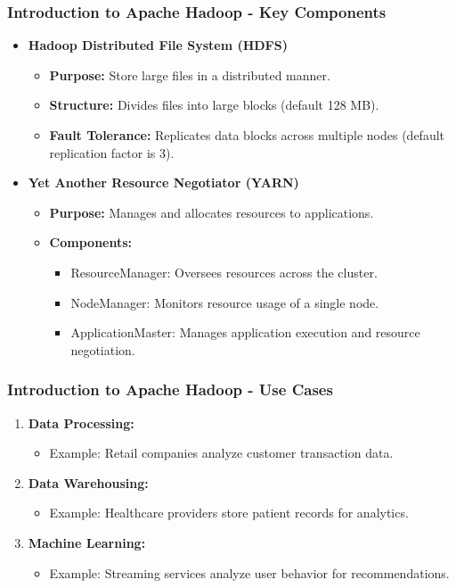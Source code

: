 \documentclass[aspectratio=169]{beamer}
\begin{document}
\begin{frame}[fragile]
    \frametitle{Introduction to Apache Hadoop - Key Components}
    \begin{itemize}
        \item \textbf{Hadoop Distributed File System (HDFS)}
        \begin{itemize}
            \item \textbf{Purpose:} Store large files in a distributed manner.
            \item \textbf{Structure:} Divides files into large blocks (default 128 MB).
            \item \textbf{Fault Tolerance:} Replicates data blocks across multiple nodes (default replication factor is 3).
        \end{itemize}

        \item \textbf{Yet Another Resource Negotiator (YARN)}
        \begin{itemize}
            \item \textbf{Purpose:} Manages and allocates resources to applications.
            \item \textbf{Components:}
            \begin{itemize}
                \item ResourceManager: Oversees resources across the cluster.
                \item NodeManager: Monitors resource usage of a single node.
                \item ApplicationMaster: Manages application execution and resource negotiation.
            \end{itemize}
        \end{itemize}
    \end{itemize}
\end{frame}

\begin{frame}[fragile]
    \frametitle{Introduction to Apache Hadoop - Use Cases}
    \begin{enumerate}
        \item \textbf{Data Processing:}
        \begin{itemize}
            \item Example: Retail companies analyze customer transaction data.
        \end{itemize}
        
        \item \textbf{Data Warehousing:}
        \begin{itemize}
            \item Example: Healthcare providers store patient records for analytics.
        \end{itemize}
        
        \item \textbf{Machine Learning:}
        \begin{itemize}
            \item Example: Streaming services analyze user behavior for recommendations.
        \end{itemize}
    \end{enumerate}
\end{frame}
\end{document}
